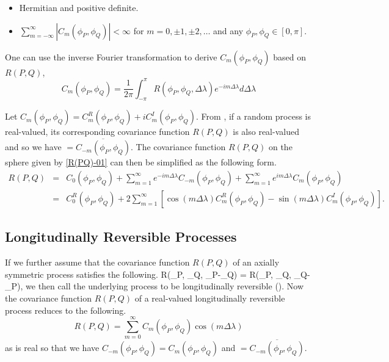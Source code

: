 		\begin{itemize}
			\item Hermitian and positive definite.
			\item $\sum_{m = -\infty}^{\infty}|C_m(\phi_P,\phi_Q)|<\infty$ for $m=0,\pm 1, \pm  2, \ldots$ and any $\phi_P, \phi_Q \in [0, \pi]$.
		\end{itemize}
				
		
One can use the inverse Fourier transformation to derive $C_m(\phi_P, \phi_Q)$ based on $R(P,Q)$, 				
		\[
			C_m(\phi_P, \phi_Q) = \frac{1}{2\pi}\int_{-\pi}^{\pi} R(\phi_P, \phi_Q, \Delta\lambda)e^{-im\Delta\lambda} d\Delta\lambda 
        \]

Let $C_m(\phi_P, \phi_Q) = C_m^R(\phi_P, \phi_Q) + i C_m^I(\phi_P, \phi_Q)$. From \cite{Huang2012}, if a random process is real-valued, its corresponding covariance function $R(P,Q)$ is also real-valued and so we have \Cm $= \overline{C_{-m}(\phi_P,\phi_Q)}$. The covariance function $R(P,Q)$ on the sphere given by \eqref{R(PQ)-01} can then be simplified as the following form.
			\begin{eqnarray*}
				R(P,Q) &=& C_0(\phi_P,\phi_Q) + \sum_{m=1}^{\infty} e^{-im\Delta\lambda}C_{-m}(\phi_P,\phi_Q) +  \sum_{m=1}^{\infty} e^{im\Delta\lambda}C_m(\phi_P,\phi_Q) \\
				&=& C_{0}^{R}(\phi_P,\phi_Q)+2 \sum_{m=1}^{\infty}[\cos(m\Delta\lambda)C_{m}^{R}(\phi_P,\phi_Q)-\sin(m\Delta\lambda)C_{m}^{I}(\phi_P,\phi_Q)].
			\end{eqnarray*}
			
			
			\subsection{Longitudinally Reversible Processes}
If we further assume that the covariance function $R(P, Q)$ of an axially symmetric process satisfies the following.
			\beq
			R(\phi_P, \phi_Q, \lambda_P-\lambda_Q) = R(\phi_P, \phi_Q, \lambda_Q-\lambda_P),
			\eeq
we then call the underlying process to be longitudinally reversible (\cite{Stein2007}). Now the covariance function $R(P, Q)$ of a real-valued longitudinally reversible process reduces to the following.			
			\[
				R(P,Q) = \sum_{m=0}^{\infty} C_m(\phi_P,\phi_Q)\cos(m\Delta\lambda)
			\]
as \Cm is real so that we have $C_{-m}(\phi_P,\phi_Q)=C_m(\phi_P,\phi_Q)$  and \Cm $= \overline{C_{-m}(\phi_P,\phi_Q)}$.


